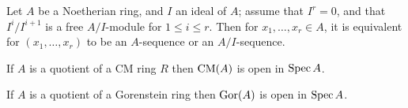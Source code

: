 \begin{exercise}\label{ex:24.1-ex}
Let $A$ be a Noetherian ring, and $I$ an ideal of $A$; assume that $I^r = 0$, and
that $I^i/I^{i+1}$ is a free $A/I$-module for $1 \le i \le r$. Then for
$x_1, \ldots, x_r \in A$, it is equivalent for $(x_1, \ldots, x_r)$ to be an
$A$-sequence or an $A/I$-sequence.
\end{exercise}

\begin{exercise}\label{ex:24.2-ex}
If $A$ is a quotient of a CM ring $R$ then $\operatorname{CM}(A)$ is open in $\operatorname{Spec} A$.
\end{exercise}

\begin{exercise}\label{ex:24.3-ex}
If $A$ is a quotient of a Gorenstein ring then $\operatorname{Gor}(A)$ is open in $\operatorname{Spec} A$.
\end{exercise}
